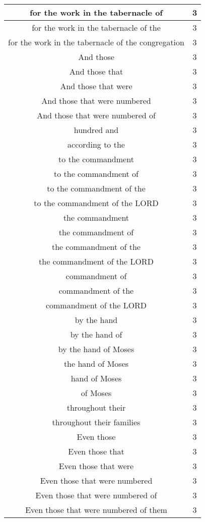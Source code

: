 \begin{center}
\begin{longtable}{|c|c|}
for the work in the tabernacle of & 3\\ \hline 
for the work in the tabernacle of the & 3\\ \hline 
for the work in the tabernacle of the congregation & 3\\ \hline 
And those & 3\\ \hline 
And those that & 3\\ \hline 
And those that were & 3\\ \hline 
And those that were numbered & 3\\ \hline 
And those that were numbered of & 3\\ \hline 
hundred and & 3\\ \hline 
according to the & 3\\ \hline 
to the commandment & 3\\ \hline 
to the commandment of & 3\\ \hline 
to the commandment of the & 3\\ \hline 
to the commandment of the LORD & 3\\ \hline 
the commandment & 3\\ \hline 
the commandment of & 3\\ \hline 
the commandment of the & 3\\ \hline 
the commandment of the LORD & 3\\ \hline 
commandment of & 3\\ \hline 
commandment of the & 3\\ \hline 
commandment of the LORD & 3\\ \hline 
by the hand & 3\\ \hline 
by the hand of & 3\\ \hline 
by the hand of Moses & 3\\ \hline 
the hand of Moses & 3\\ \hline 
hand of Moses & 3\\ \hline 
of Moses & 3\\ \hline 
throughout their & 3\\ \hline 
throughout their families & 3\\ \hline 
Even those & 3\\ \hline 
Even those that & 3\\ \hline 
Even those that were & 3\\ \hline 
Even those that were numbered & 3\\ \hline 
Even those that were numbered of & 3\\ \hline 
Even those that were numbered of them & 3\\ \hline 

\end{longtable}
\end{center}
